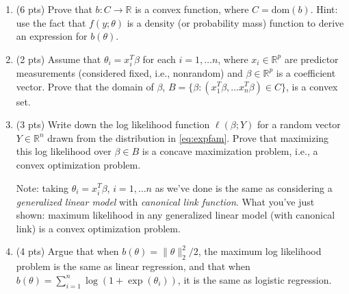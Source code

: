 \documentclass{article}
\theoremstyle{remark}
\theoremstyle{definition}
\def\R{\mathbb{R}}
\def\dom{\mathrm{dom}}
\begin{document}
\begin{enumerate}
\item (6 pts) Prove that $b : C \rightarrow \R$ is a convex function, where $C = 
  \dom(b)$. Hint: use the fact that $f(y; \theta)$ is a density (or probability
  mass) function to derive an expression for $b(\theta)$.

\item (2 pts) Assume that $\theta_i = x_i^T \beta$ for each $i=1,\ldots n$, 
  where $x_i \in \R^p$ are predictor measurements (considered fixed,
  i.e., nonrandom) and $\beta \in \R^p$ is a coefficient vector.
  Prove that the domain of $\beta$, $B = \{\beta : (x_1^T \beta, \ldots
  x_n^T \beta) \in C\}$, is a convex set.

\item (3 pts) Write down the log likelihood function $\ell(\beta; Y)$ for a random 
  vector $Y \in \R^n$ drawn from the distribution in \eqref{eq:expfam}.  
  Prove that maximizing this log likelihood over $\beta \in B$ is a concave
  maximization problem, i.e., a convex optimization problem.  

  Note: taking $\theta_i=x_i^T \beta$, $i=1,\ldots n$ as we've done is
  the same as considering a {\it generalized linear model} with {\it canonical
    link function}.  What you've just shown: maximum likelihood in any
  generalized linear model (with canonical link) is a convex optimization
  problem. 

\item (4 pts) Argue that when $b(\theta) = \|\theta\|_2^2/2$, the maximum log 
  likelihood problem is the same as linear regression, and that when 
  $b(\theta) = \sum_{i=1}^n \log(1+\exp(\theta_i))$, it is the same as logistic
  regression. 


\end{enumerate}
\end{document}
